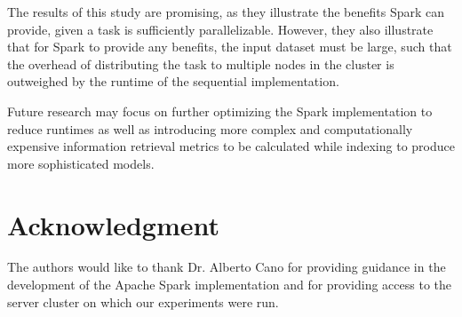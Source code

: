 \documentclass[conference]{IEEEtran}
\begin{document}
The results of this study are promising, as they illustrate the benefits Spark can provide, given a task is sufficiently parallelizable.  However, they also illustrate that for Spark to provide any benefits, the input dataset must be large, such that the overhead of distributing the task to multiple nodes in the cluster is outweighed by the runtime of the sequential implementation.    

Future research may focus on further optimizing the Spark implementation to reduce runtimes as well as introducing more complex and computationally expensive information retrieval metrics to be calculated while indexing to produce more sophisticated models.



\section*{Acknowledgment}
The authors would like to thank Dr. Alberto Cano for providing guidance in the development of the Apache Spark implementation and for providing access to the server cluster on which our experiments were run. 






%
%
%

\end{document}
